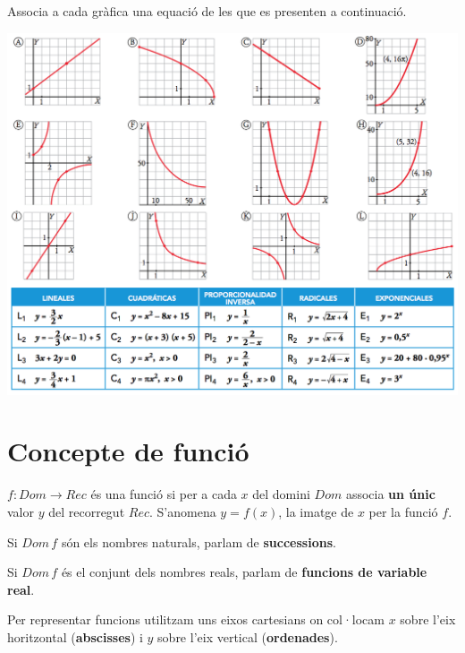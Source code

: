  \vspace*{\fill}
 
\newpage
{}

Associa a cada gràfica una equació de les que es presenten a continuació.

\includegraphics[width=\textwidth]{img-05/chap6-inicial.png}


\section{Concepte de funció}

\begin{theorybox}
	$f: Dom \rightarrow Rec$ és una funció si per a cada $x$ del domini $Dom$ associa \textbf{un únic} valor $y$ del recorregut $Rec$. S'anomena $y=f(x)$, la imatge de $x$ per la funció $f$.
	
	Si $Dom\, f$ són els nombres naturals, parlam de \textbf{successions}.
	
	Si $Dom\, f$ és el conjunt dels nombres reals, parlam de \textbf{funcions de variable real}.
	
	
	Per representar funcions utilitzam uns eixos cartesians on col·locam $x$ sobre l'eix horitzontal (\textbf{abscisses}) i $y$ sobre l'eix vertical (\textbf{ordenades}).
\end{theorybox}


